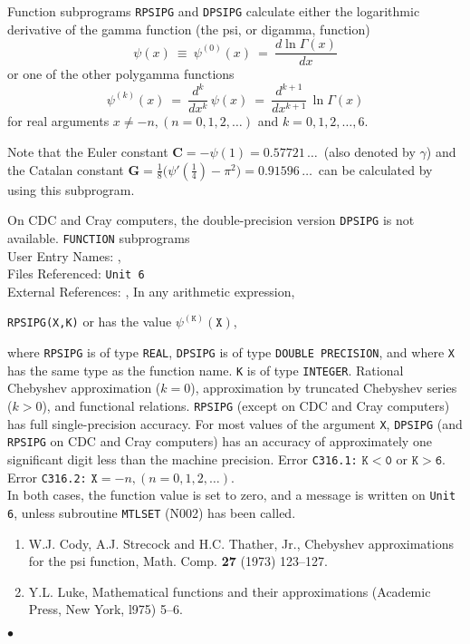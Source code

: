                        
                 
\Submitter{}                           
Function subprograms {\tt RPSIPG} and {\tt DPSIPG} calculate either
the logarithmic derivative of the gamma function (the psi, or
digamma, function)
$$ \psi(x) \ \equiv \ \psi^{(0)}(x) \ = \ \frac{d\ln \Gamma(x)} {dx}$$
or one of the other polygamma functions
$$ \psi^{(k)}(x) \ = \ \frac{d^k}{dx^k} \, \psi(x) \ = \
\frac{d^{k+1}}{dx^{k+1}} \, \ln \Gamma(x) $$
for real arguments $ x \neq -n,(n=0,1,2,\ldots)$ and
$k = 0,1,2,\ldots,6$.
\par
Note that the Euler constant
$\mathbf{C} = -\psi(1)= 0.57721\,\ldots$\, (also denoted by $\gamma$)
and the Catalan constant
$\mathbf{G}=\frac{1}{8}\big(\psi'(\frac{1}{4})-\pi^2\big) =
0.91596\,\ldots$\, can be calculated by using this subprogram.
\par
On CDC and Cray computers, the double-precision version
{\tt DPSIPG} is not available.
\Structure
{\tt FUNCTION} subprograms\\
User Entry Names: ,  \\
Files Referenced: {\tt Unit 6} \\
External References: , 
\Usage
In any arithmetic expression,
\begin{center}
{\tt RPSIPG(X,K)} \quad or  \quad has the value
\quad $\psi^{(\mathtt{K})}(\mathtt{X})$,
\end{center}
where {\tt RPSIPG} is of type {\tt REAL}, {\tt DPSIPG} is of type
{\tt DOUBLE PRECISION}, and where {\tt X} has the same type as the
function name. {\tt K} is of type {\tt INTEGER}.
\Method
Rational Chebyshev approximation ($k = 0$), approximation by truncated
Chebyshev series ($k > 0$), and functional relations.
\Accuracy
{\tt RPSIPG} (except on CDC and Cray computers)
has full single-precision accuracy.
For most values of the argument {\tt X}, {\tt DPSIPG}
(and {\tt RPSIPG} on CDC and Cray computers) has an accuracy of
approximately one significant digit less than the machine precision.
\Errorh
Error {\tt C316.1:} $\mathtt{K < 0}$ or $\mathtt{K > 6}$. \\
Error {\tt C316.2:} $\mathtt{X} = -n, (n=0,1,2,\ldots)$. \\
In both cases, the function value is set to zero, and a message is
written on {\tt Unit 6}, unless subroutine {\tt MTLSET} (N002) has
been called.
\Refer
\begin{enumerate}
\item W.J. Cody, A.J. Strecock and H.C. Thather, Jr., Chebyshev
approximations for the psi function, Math. Comp. {\bf 27} (1973)
123--127.
\item Y.L. Luke, Mathematical functions and their approximations
(Academic Press, New York, l975) 5--6.
\end{enumerate}
$\bullet$
